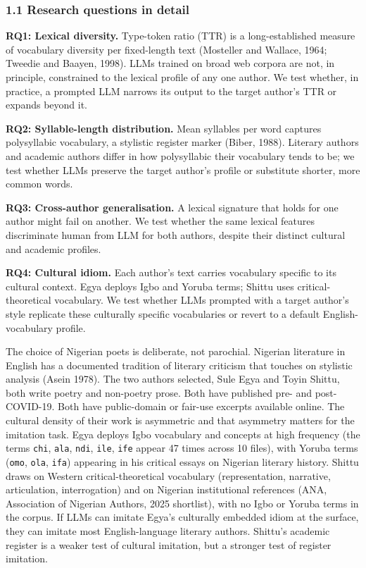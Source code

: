\subsubsection{1.1 Research questions in
detail}\label{research-questions-in-detail}

\textbf{RQ1: Lexical diversity.} Type-token ratio (TTR) is a
long-established measure of vocabulary diversity per fixed-length text
(Mosteller and Wallace, 1964; Tweedie and Baayen, 1998). LLMs trained on
broad web corpora are not, in principle, constrained to the lexical
profile of any one author. We test whether, in practice, a prompted LLM
narrows its output to the target author's TTR or expands beyond it.

\textbf{RQ2: Syllable-length distribution.} Mean syllables per word
captures polysyllabic vocabulary, a stylistic register marker (Biber,
1988). Literary authors and academic authors differ in how polysyllabic
their vocabulary tends to be; we test whether LLMs preserve the target
author's profile or substitute shorter, more common words.

\textbf{RQ3: Cross-author generalisation.} A lexical signature that
holds for one author might fail on another. We test whether the same
lexical features discriminate human from LLM for both authors, despite
their distinct cultural and academic profiles.

\textbf{RQ4: Cultural idiom.} Each author's text carries vocabulary
specific to its cultural context. Egya deploys Igbo and Yoruba terms;
Shittu uses critical-theoretical vocabulary. We test whether LLMs
prompted with a target author's style replicate these culturally
specific vocabularies or revert to a default English-vocabulary profile.

The choice of Nigerian poets is deliberate, not parochial. Nigerian
literature in English has a documented tradition of literary criticism
that touches on stylistic analysis (Asein 1978). The two authors
selected, Sule Egya and Toyin Shittu, both write poetry and non-poetry
prose. Both have published pre- and post-COVID-19. Both have
public-domain or fair-use excerpts available online. The cultural
density of their work is asymmetric and that asymmetry matters for the
imitation task. Egya deploys Igbo vocabulary and concepts at high
frequency (the terms \texttt{chi}, \texttt{ala}, \texttt{ndi},
\texttt{ile}, \texttt{ife} appear 47 times across 10 files), with Yoruba
terms (\texttt{omo}, \texttt{ola}, \texttt{ifa}) appearing in his
critical essays on Nigerian literary history. Shittu draws on Western
critical-theoretical vocabulary (representation, narrative,
articulation, interrogation) and on Nigerian institutional references
(ANA, Association of Nigerian Authors, 2025 shortlist), with no Igbo or
Yoruba terms in the corpus. If LLMs can imitate Egya's culturally
embedded idiom at the surface, they can imitate most English-language
literary authors. Shittu's academic register is a weaker test of
cultural imitation, but a stronger test of register imitation.

